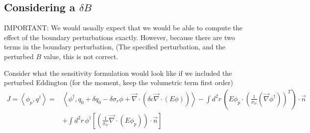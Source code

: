 \documentclass{article}
\newcommand{\bra}{\left\langle}
\newcommand{\ket}{\right\rangle}
\newcommand{\vdiv}{\vec{\nabla} \cdot}
\newcommand{\vgrad}{\vec{\nabla}}
\begin{document}
\subsection{Considering a $\delta B$}
IMPORTANT: We would usually expect that we would be able to compute the effect of the boundary perturbations exactly. However, because there are two terms in the boundary perturbation, (The specified perturbation, and the perturbed  $B$ value, this is not correct.

Consider what the sensitivity formulation would look like if we included the perturbed Eddington (for the moment, keep the volumetric term first order)
\begin{align*}
J = \bra \phi_p, q^\dag \ket =& \bra \phi^\dag , q_0 + \delta q_0 - \delta \sigma_r \phi + \vdiv \left( \delta c \vdiv \left( E \phi \right) \right)  \ket - \int d^2 r \, \left( E \phi_p \cdot \left( \frac{1}{ \sigma_{tr}} \left(  \vgrad \phi^\dag \right) \right)^T \right) \cdot \vec{n} \\
&+ \int d^2 r \, \phi^\dag \left[ \left( \frac{1}{\sigma_{tr}} \vdiv \left( E \phi_p \right) \right) \cdot \vec{n} \right]
\end{align*}
\end{document}
